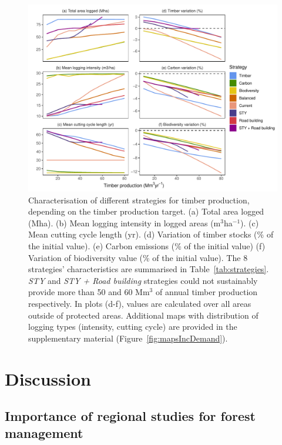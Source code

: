 \documentclass{article}
\begin{document}
\begin{figure}
    \centering
    \includegraphics[width=\linewidth]{graphs/increasingDemand.pdf}
    \caption{Characterisation of different strategies for timber production, depending on the timber production target. (a) Total area logged (Mha). (b) Mean logging intensity in logged areas (m$^3$ha$^{-1}$). (c) Mean cutting cycle length (yr). (d) Variation of timber stocks (\% of the initial value). (e) Carbon emissions (\% of the initial value) (f) Variation of biodiversity value (\% of the initial value). The 8 strategies' characteristics are summarised in Table~\ref{tab:strategies}. \textit{STY} and \textit{STY + Road building} strategies could not sustainably provide more than 50 and 60 Mm$^3$ of annual timber production respectively. In plots (d-f), values are calculated over all areas outside of protected areas. Additional maps with distribution of logging types (intensity, cutting cycle) are provided in the supplementary material (Figure~\ref{fig:mapsIncDemand}).}
    \label{fig:incDemand}
\end{figure}

\section{Discussion}

\subsection{Importance of regional studies for forest management}
\end{document}
